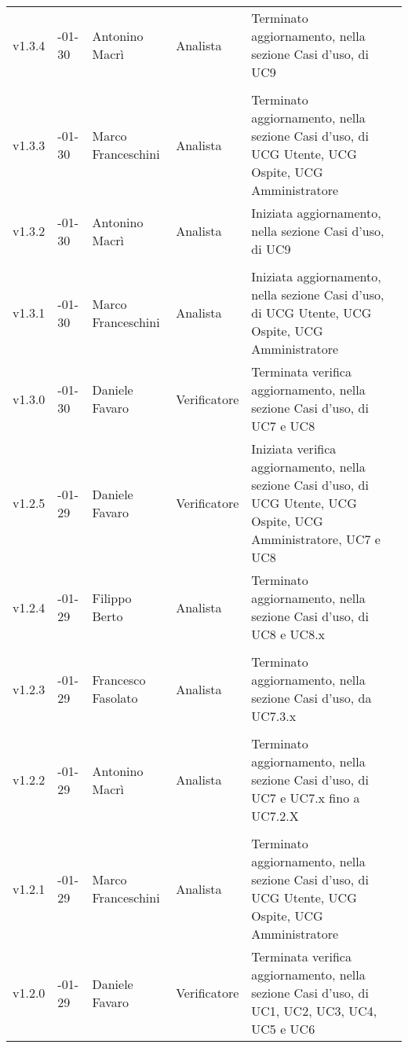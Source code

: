 \begin{longtable} { >{\centering}p{1.4cm} >{\centering}p{2cm} >{\centering}p{2.3cm} >{\centering}p{2.7cm} p{5.5cm} }
		\midrule
		\addlinespace[0.4em]
		v1.3.4 & 2017-01-30 & Antonino Macrì & Analista & Terminato aggiornamento, nella sezione Casi d'uso, di UC9 \\ \\
		\addlinespace[0.4em]
		\midrule
		\addlinespace[0.4em]
		v1.3.3 & 2017-01-30 & Marco Franceschini & Analista & Terminato aggiornamento, nella sezione Casi d'uso, di UCG Utente, UCG Ospite, UCG Amministratore \\ 
		\addlinespace[0.4em]
		\midrule
		\addlinespace[0.4em]
		v1.3.2 & 2017-01-30 & Antonino Macrì & Analista & Iniziata aggiornamento, nella sezione Casi d'uso, di UC9 \\ \\
		\addlinespace[0.4em]
		\midrule
		\addlinespace[0.4em]
		v1.3.1 & 2017-01-30 & Marco Franceschini & Analista & Iniziata aggiornamento, nella sezione Casi d'uso, di UCG Utente, UCG Ospite, UCG Amministratore \\
		\addlinespace[0.4em]
		\midrule
		\addlinespace[0.4em]
		v1.3.0 & 2017-01-30 &  Daniele Favaro & Verificatore & Terminata verifica aggiornamento, nella sezione Casi d'uso, di UC7 e UC8 \\
		\addlinespace[0.4em]
		\midrule
		\addlinespace[0.4em]
		v1.2.5 & 2017-01-29 & Daniele Favaro & Verificatore & Iniziata verifica aggiornamento, nella sezione Casi d'uso, di UCG Utente, UCG Ospite, UCG Amministratore, UC7 e UC8 \\
		\addlinespace[0.4em]
		\midrule
		\addlinespace[0.4em]
		v1.2.4 & 2017-01-29 & Filippo Berto & Analista & Terminato aggiornamento, nella sezione Casi d'uso, di UC8 e UC8.x \\ \\
		\addlinespace[0.4em]
		\midrule
		\addlinespace[0.4em]
		v1.2.3 & 2017-01-29 & Francesco Fasolato & Analista & Terminato aggiornamento, nella sezione Casi d'uso, da UC7.3.x\\ \\
		\addlinespace[0.4em]
		\midrule
		\addlinespace[0.4em]
		v1.2.2 & 2017-01-29 & Antonino Macrì & Analista & Terminato aggiornamento, nella sezione Casi d'uso, di UC7 e UC7.x fino a UC7.2.X \\ \\
		\addlinespace[0.4em]
		\midrule
		\addlinespace[0.4em]
		v1.2.1 & 2017-01-29 & Marco Franceschini & Analista & Terminato aggiornamento, nella sezione Casi d'uso, di UCG Utente, UCG Ospite, UCG Amministratore \\ 
		\addlinespace[0.4em]
		\midrule
		\addlinespace[0.4em]
		v1.2.0 & 2017-01-29 & Daniele Favaro & Verificatore & Terminata verifica aggiornamento, nella sezione Casi d'uso, di UC1, UC2, UC3, UC4, UC5 e UC6 \\

\end{longtable}
